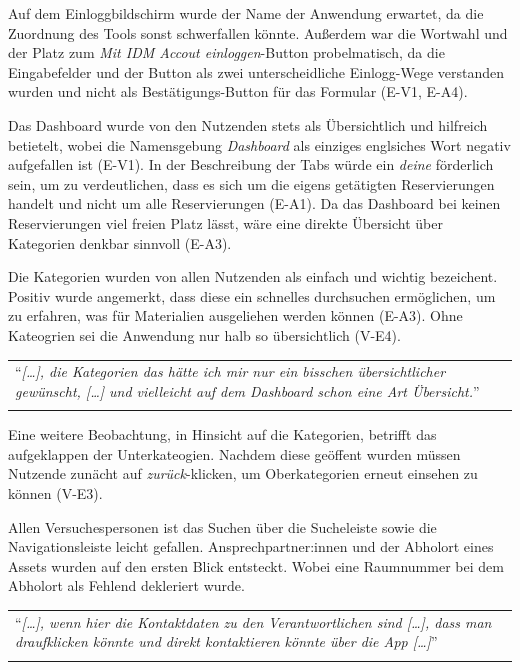 Auf dem Einloggbildschirm wurde der Name der Anwendung erwartet, da die
Zuordnung des Tools sonst schwerfallen könnte. Außerdem war die Wortwahl und der
Platz zum \textit{Mit IDM Accout einloggen}-Button probelmatisch, da die
Eingabefelder und der Button als zwei unterscheidliche Einlogg-Wege verstanden
wurden und nicht als Bestätigungs-Button für das Formular (E-V1, E-A4).

Das Dashboard wurde von den Nutzenden stets als Übersichtlich und hilfreich
betietelt, wobei die Namensgebung \textit{Dashboard} als einziges englsiches
Wort negativ aufgefallen ist (E-V1). In der Beschreibung der Tabs würde ein
\textit{deine} förderlich sein, um zu verdeutlichen, dass es sich um die eigens
getätigten Reservierungen handelt und nicht um alle Reservierungen (E-A1). Da
das Dashboard bei keinen Reservierungen viel freien Platz lässt, wäre eine
direkte Übersicht über Kategorien denkbar sinnvoll (E-A3).

Die Kategorien wurden von allen Nutzenden als einfach und wichtig bezeichent.
Positiv wurde angemerkt, dass diese ein schnelles durchsuchen ermöglichen, um zu
erfahren, was für Materialien ausgeliehen werden können (E-A3). Ohne Kateogrien
sei die Anwendung nur halb so übersichtlich (V-E4).

\begin{longtable}{p{}} \arrayrulecolor{maincolor}\hline
  \enquote{\textit{[\dots], die Kategorien das hätte ich mir nur ein bisschen
      übersichtlicher gewünscht, [\dots] und vielleicht auf dem Dashboard schon eine
  Art Übersicht.}} \\
  \arrayrulecolor{maincolor}\hline
\end{longtable}

Eine weitere Beobachtung, in Hinsicht auf die Kategorien, betrifft das
aufgeklappen der Unterkateogien. Nachdem diese geöffent wurden müssen Nutzende
zunächt auf \textit{zurück}-klicken, um Oberkategorien erneut einsehen zu können
(V-E3).

Allen Versuchespersonen ist das Suchen über die Sucheleiste sowie die
Navigationsleiste leicht gefallen. Ansprechpartner:innen und der Abholort eines
Assets wurden auf den ersten Blick entsteckt. Wobei eine Raumnummer bei dem
Abholort als Fehlend dekleriert wurde.

\begin{longtable}{p{}} \arrayrulecolor{maincolor}\hline
  \enquote{\textit{[\dots], wenn hier die Kontaktdaten zu den Verantwortlichen
      sind [\dots], dass man draufklicken könnte und direkt kontaktieren könnte
  über die App [\dots]}} \\
  \arrayrulecolor{maincolor}\hline
\end{longtable}

